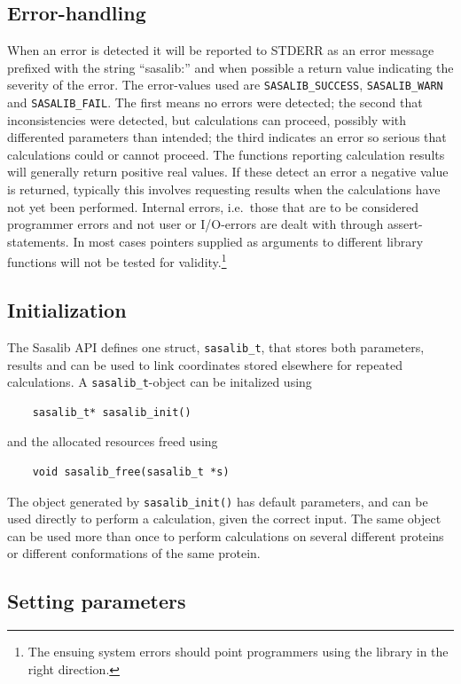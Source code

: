\documentclass[a4paper,11pt]{article}
\begin{document}
\subsection{Error-handling}

When an error is detected it will be reported to STDERR as an error
message prefixed with the string ``sasalib:'' and when possible a
return value indicating the severity of the error. The error-values
used are \verb|SASALIB_SUCCESS|, \verb|SASALIB_WARN| and
\verb|SASALIB_FAIL|. The first means no errors were detected; the
second that inconsistencies were detected, but calculations can
proceed, possibly with differented parameters than intended; the third
indicates an error so serious that calculations could or cannot
proceed. The functions reporting calculation results will generally
return positive real values. If these detect an error a negative value
is returned, typically this involves requesting results when the
calculations have not yet been performed.  Internal errors,
i.e.\ those that are to be considered programmer errors and not user
or I/O-errors are dealt with through assert-statements. In most cases
pointers supplied as arguments to different library functions will not
be tested for validity.\footnote{The ensuing system errors should point
programmers using the library in the right direction.}

\subsection{Initialization}

The Sasalib API defines one struct, \verb|sasalib_t|, that stores
both parameters, results and can be used to link coordinates stored
elsewhere for repeated calculations. A \verb|sasalib_t|-object can be
initalized using
\begin{verbatim}
    sasalib_t* sasalib_init()
\end{verbatim}
and the allocated resources freed using
\begin{verbatim}
    void sasalib_free(sasalib_t *s)
\end{verbatim}
The object generated by \verb|sasalib_init()| has default parameters,
and can be used directly to perform a calculation, given the correct
input. The same object can be used more than once to perform
calculations on several different proteins or different conformations
of the same protein.

\subsection{Setting parameters}
\end{document}
